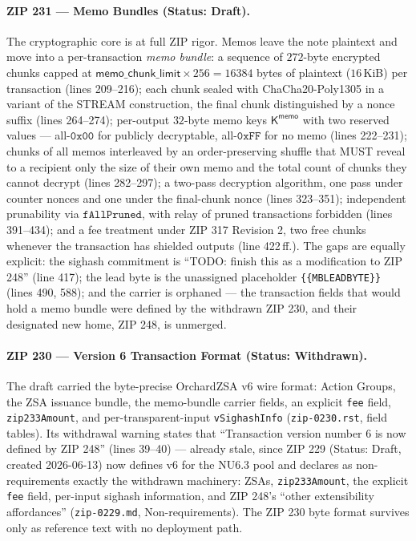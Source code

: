 \documentclass[11pt,a4paper]{article}
\theoremstyle{definition}
\begin{document}
\paragraph{ZIP 231 --- Memo Bundles (Status: Draft).}
The cryptographic core is at full ZIP rigor. Memos leave the note plaintext
and move into a per-transaction \emph{memo bundle}: a sequence of $272$-byte
encrypted chunks capped at
$\mathsf{memo\_chunk\_limit} \times 256 = 16384$ bytes of plaintext
($16$\,KiB) per transaction (lines 209--216); each chunk sealed with
ChaCha20-Poly1305 in a variant of the STREAM construction, the final chunk
distinguished by a nonce suffix (lines 264--274); per-output $32$-byte memo
keys $\mathsf{K^{memo}}$ with two reserved values --- all-$\mathtt{0x00}$
for publicly decryptable, all-$\mathtt{0xFF}$ for no memo (lines 222--231);
chunks of all memos interleaved by an order-preserving shuffle that MUST
reveal to a recipient only the size of their own memo and the total count of
chunks they cannot decrypt (lines 282--297); a two-pass decryption
algorithm, one pass under counter nonces and one under the final-chunk nonce
(lines 323--351); independent prunability via $\mathtt{fAllPruned}$, with
relay of pruned transactions forbidden (lines 391--434); and a fee treatment
under ZIP 317 Revision 2, two free chunks whenever the transaction has
shielded outputs (line 422\,ff.). The gaps are equally explicit: the sighash
commitment is ``TODO: finish this as a modification to ZIP 248'' (line 417);
the lead byte is the unassigned placeholder \texttt{\{\{MBLEADBYTE\}\}}
(lines 490, 588); and the carrier is orphaned --- the transaction fields
that would hold a memo bundle were defined by the withdrawn ZIP 230, and
their designated new home, ZIP 248, is unmerged.

\paragraph{ZIP 230 --- Version 6 Transaction Format (Status: Withdrawn).}
The draft carried the byte-precise OrchardZSA v6 wire format: Action Groups,
the ZSA issuance bundle, the memo-bundle carrier fields, an explicit
\texttt{fee} field, \texttt{zip233Amount}, and per-transparent-input
\texttt{vSighashInfo} (\texttt{zip-0230.rst}, field tables). Its withdrawal
warning states that ``Transaction version number 6 is now defined by
ZIP 248'' (lines 39--40) --- already stale, since ZIP 229 (Status: Draft,
created 2026-06-13) now defines v6 for the NU6.3 pool and declares as
non-requirements exactly the withdrawn machinery: ZSAs,
\texttt{zip233Amount}, the explicit \texttt{fee} field, per-input sighash
information, and ZIP 248's ``other extensibility affordances''
(\texttt{zip-0229.md}, Non-requirements). The ZIP 230 byte format survives
only as reference text with no deployment path.
\end{document}
